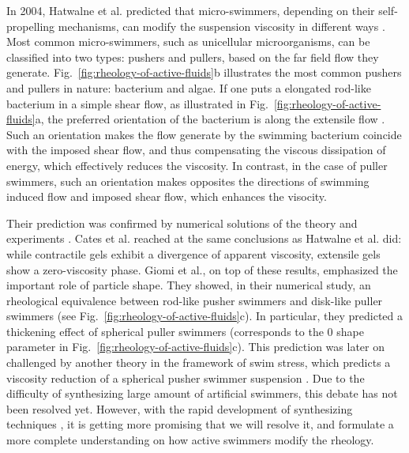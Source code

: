 In 2004, Hatwalne et al. predicted that micro-swimmers, depending on their self-propelling mechanisms, can modify the suspension viscosity in different ways \cite{Hatwalne2004}. Most common micro-swimmers, such as unicellular microorganisms, can be classified into two types: pushers and pullers, based on the far field flow they generate. Fig.~\ref{fig:rheology-of-active-fluids}b illustrates the most common pushers and pullers in nature: bacterium and algae. If one puts a elongated rod-like bacterium in a simple shear flow, as illustrated in Fig.~\ref{fig:rheology-of-active-fluids}a, the preferred orientation of the bacterium is along the extensile flow \cite{Forster1974}. Such an orientation makes the flow generate by the swimming bacterium coincide with the imposed shear flow, and thus compensating the viscous dissipation of energy, which effectively reduces the viscosity. In contrast, in the case of puller swimmers, such an orientation makes opposites the directions of swimming induced flow and imposed shear flow, which enhances the visocity.

Their prediction was confirmed by numerical solutions of the theory \cite{Cates2008, Giomi2010} and experiments \cite{Sokolov2009, Gachelin2013, Lopez2015}. Cates et al. reached at the same conclusions as Hatwalne et al. did: while contractile gels exhibit a divergence of apparent viscosity, extensile gels show a zero-viscosity phase. Giomi et al., on top of these results, emphasized the important role of particle shape. They showed, in their numerical study, an rheological equivalence between rod-like pusher swimmers and disk-like puller swimmers (see Fig.~\ref{fig:rheology-of-active-fluids}c). In particular, they predicted a thickening effect of spherical puller swimmers (corresponds to the 0 shape parameter in Fig.~\ref{fig:rheology-of-active-fluids}c). This prediction was later on challenged by another theory in the framework of swim stress, which predicts a viscosity reduction of a spherical pusher swimmer suspension
\cite{Takatori2017}. Due to the difficulty of synthesizing large amount of artificial swimmers, this debate has not been resolved yet. However, with the rapid development of synthesizing techniques \cite{Palacci2013, Bricard2013}, it is getting more promising that we will resolve it, and formulate a more complete understanding on how active swimmers modify the rheology.

